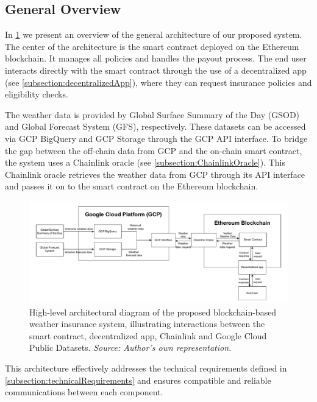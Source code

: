 \subsection{General Overview}\label{subsection:generalOverview}
In \cref{fig:generalArchitecture} we present an overview of the general architecture of our proposed system. The center of the architecture is the smart contract deployed on the Ethereum blockchain. It manages all policies and handles the payout process. The end user interacts directly with the smart contract through the use of a decentralized app (see \cref{subsection:decentralizedApp}), where they can request insurance policies and eligibility checks.

The weather data is provided by Global Surface Summary of the Day (GSOD) and Global Forecast System (GFS), respectively. These datasets can be accessed via GCP BigQuery and GCP Storage through the GCP API interface. To bridge the gap between the off-chain data from GCP and the on-chain smart contract, the system uses a Chainlink oracle (see \cref{subsection:ChainlinkOracle}). This Chainlink oracle retrieves the weather data from GCP through its API interface and passes it on to the smart contract on the Ethereum blockchain.

\begin{figure}[ht]
    \centering
    \includegraphics[width=1\textwidth]{figures/architecture-overview.drawio.pdf}
    \caption{High-level architectural diagram of the proposed blockchain-based weather insurance system, illustrating interactions between the smart contract, decentralized app, Chainlink and Google Cloud Public Datasets. \textit{Source: Author's own representation.}}
    \label{fig:generalArchitecture}
\end{figure}

This architecture effectively addresses the technical requirements defined in \cref{subsection:technicalRequirements} and ensures compatible and reliable communications between each component.

